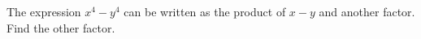 The expression $x^4-y^4$ can be written as the product of $x-y$ and another factor. Find the other factor.
